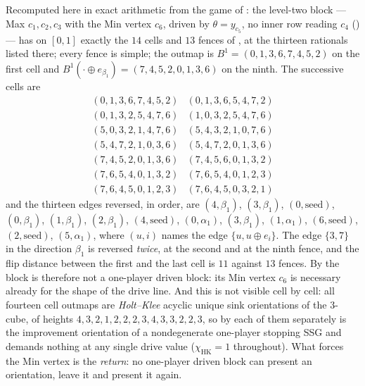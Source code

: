 \begin{proposition}\label{mw:b2-return}
Recomputed here in exact arithmetic from the game of :
the level-two block --- Max $c_1,c_2,c_3$ with the Min vertex $c_6$, driven by
$\theta=y_{c_5}$, no inner row reading $c_4$ () --- has
on $[0,1]$ exactly the $14$ cells and $13$ fences of
, at the thirteen rationals listed there; every fence
is simple; the outmap is $B^{1}=(0,1,3,6,7,4,5,2)$ on the first cell and
$B^{1}(\cdot\oplus e_{\beta_1})=(7,4,5,2,0,1,3,6)$ on the ninth. The
successive cells are
\[
 \begin{array}{ll}
 (0,1,3,6,7,4,5,2)&(0,1,3,6,5,4,7,2)\\
 (0,1,3,2,5,4,7,6)&(1,0,3,2,5,4,7,6)\\
 (5,0,3,2,1,4,7,6)&(5,4,3,2,1,0,7,6)\\
 (5,4,7,2,1,0,3,6)&(5,4,7,2,0,1,3,6)\\
 (7,4,5,2,0,1,3,6)&(7,4,5,6,0,1,3,2)\\
 (7,6,5,4,0,1,3,2)&(7,6,5,4,0,1,2,3)\\
 (7,6,4,5,0,1,2,3)&(7,6,4,5,0,3,2,1)
 \end{array}
\]
and the thirteen edges reversed, in order, are $(4,\beta_1)$, $(3,\beta_1)$,
$(0,\mathrm{seed})$, $(0,\beta_1)$, $(1,\beta_1)$, $(2,\beta_1)$,
$(4,\mathrm{seed})$, $(0,\alpha_1)$, $(3,\beta_1)$, $(1,\alpha_1)$,
$(6,\mathrm{seed})$, $(2,\mathrm{seed})$, $(5,\alpha_1)$, where $(u,i)$ names
the edge $\{u,u\oplus e_i\}$. The edge $\{3,7\}$ in the direction $\beta_1$
is reversed \emph{twice}, at the second and at the ninth fence, and the flip
distance between the first and the last cell is $11$ against $13$ fences.
By  the block is therefore not a one-player driven
block: its Min vertex $c_6$ is necessary already for the shape of the drive
line. And this is not visible cell by cell: all fourteen cell outmaps are
\emph{Holt--Klee} acyclic unique sink orientations of the $3$-cube, of
heights $4,3,2,1,2,2,2,3,4,3,3,2,2,3$, so by  each of
them separately is the improvement orientation of a nondegenerate one-player
stopping SSG and  demands nothing at any single drive
value ($\chi_{\mathrm{HK}}=1$ throughout). What forces the Min vertex is the
\emph{return}: no one-player driven block can present an orientation, leave
it and present it again.
\end{proposition}

